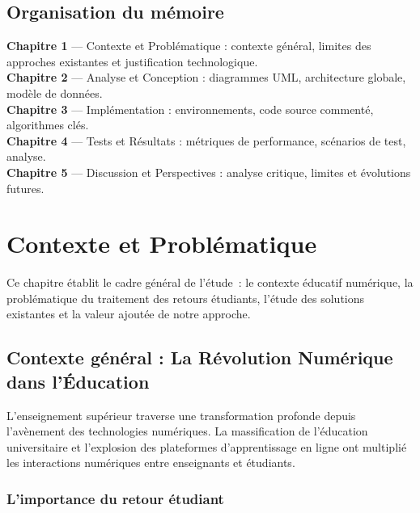 \documentclass[12pt,a4paper,oneside]{report}
\begin{document}
\section*{Organisation du mémoire}

\noindent\textbf{Chapitre 1} --- Contexte et Problématique : contexte
général, limites des approches existantes et justification technologique.\\
\noindent\textbf{Chapitre 2} --- Analyse et Conception : diagrammes UML,
architecture globale, modèle de données.\\
\noindent\textbf{Chapitre 3} --- Implémentation : environnements, code source
commenté, algorithmes clés.\\
\noindent\textbf{Chapitre 4} --- Tests et Résultats : métriques de performance,
scénarios de test, analyse.\\
\noindent\textbf{Chapitre 5} --- Discussion et Perspectives : analyse critique,
limites et évolutions futures.
\cleardoublepage

\chapter{Contexte et Problématique}

\begin{infobox}
Ce chapitre établit le cadre général de l'étude~: le contexte éducatif
numérique, la problématique du traitement des retours étudiants, l'étude
des solutions existantes et la valeur ajoutée de notre approche.
\end{infobox}

\section{Contexte général : La Révolution Numérique dans l'Éducation}

L'enseignement supérieur traverse une transformation profonde depuis l'avènement
des technologies numériques. La massification de l'éducation universitaire et
l'explosion des plateformes d'apprentissage en ligne ont multiplié les
interactions numériques entre enseignants et étudiants.

\subsection{L'importance du retour étudiant}
\end{document}
